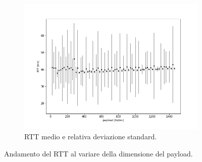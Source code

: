 \documentclass[a4paper,10pt]{article}
\begin{document}
\begin{figure}[h!]
\begin{subfigure}[b]{0.49\textwidth}
         \includegraphics[width=\textwidth]{img/avg.png}
         \caption{RTT medio e relativa deviazione standard.}
         \label{fig:rttavg}
     \end{subfigure}
        \caption{Andamento del RTT al variare della dimensione del payload.}
        \label{fig:rttfig}
\end{figure}
\end{document}
